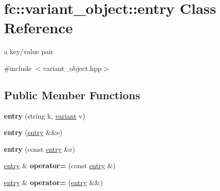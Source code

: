 \hypertarget{classfc_1_1variant__object_1_1entry}{}\section{fc\+:\+:variant\+\_\+object\+:\+:entry Class Reference}
\label{classfc_1_1variant__object_1_1entry}


a key/value pair  




{\ttfamily \#include $<$variant\+\_\+object.\+hpp$>$}

\subsection*{Public Member Functions}
\begin{DoxyCompactItemize}
\item 
\mbox{\label{classfc_1_1variant__object_1_1entry_a67bc921add04c5cf061b134edbbaa3da}} 
{\bfseries entry} (string k, \mbox{\hyperlink{classfc_1_1variant}{variant}} v)
\item 
\mbox{\label{classfc_1_1variant__object_1_1entry_af379c114440e39f60cbe737fbbc4f044}} 
{\bfseries entry} (\mbox{\hyperlink{classfc_1_1variant__object_1_1entry}{entry}} \&\&e)
\item 
\mbox{\label{classfc_1_1variant__object_1_1entry_a986538ecb36d7bdd5d0dcbc8adf02b4b}} 
{\bfseries entry} (const \mbox{\hyperlink{classfc_1_1variant__object_1_1entry}{entry}} \&e)
\item 
\mbox{\label{classfc_1_1variant__object_1_1entry_ad8e8da80a39391d7c4c71dbf439cc17a}} 
\mbox{\hyperlink{classfc_1_1variant__object_1_1entry}{entry}} \& {\bfseries operator=} (const \mbox{\hyperlink{classfc_1_1variant__object_1_1entry}{entry}} \&)
\item 
\mbox{\label{classfc_1_1variant__object_1_1entry_a54669b8a1ba8a9dd3fa1d4fac4cec0bd}} 
\mbox{\hyperlink{classfc_1_1variant__object_1_1entry}{entry}} \& {\bfseries operator=} (\mbox{\hyperlink{classfc_1_1variant__object_1_1entry}{entry}} \&\&)
\item 

\end{DoxyCompactItemize}
